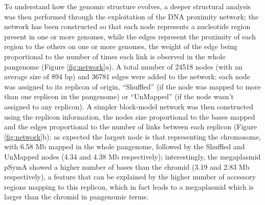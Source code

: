 To understand how the genomic structure evolves, a deeper structural analysis was then performed through the exploitation of the DNA proximity network; the network has been constructed so that each node represents a nucleotide region present in one or more genomes, while the edges represent the proximity of each region to the others on one or more genomes, the weight of the edge being proportional to the number of times each link is observed in the whole pangenome (Figure \ref{fig:network}a). A total number of 24518 nodes (with an average size of 894 bp) and 36781 edges were added to the network: each node was assigned to its replicon of origin, “Shuffled” (if the node was mapped to more than one replicon in the pangenome) or “UnMapped” (if the node wasn’t assigned to any replicon). A simpler block-model network was then constructed using the replicon information, the nodes size proportional to the bases mapped and the edges proportional to the number of links between each replicon (Figure \ref{fig:network}b): as expected the largest node is that representing the chromosome, with 6.58 Mb mapped in the whole pangenome, followed by the Shuffled and UnMapped nodes (4.34 and 4.38 Mb respectively); interestingly, the megaplasmid pSymA showed a higher number of bases than the chromid (3.19 and 2.83 Mb respectively), a feature that can be explained by the higher number of accessory regions mapping to this replicon, which in fact leads to a megaplasmid which is larger than the chromid in pangenomic terms.

